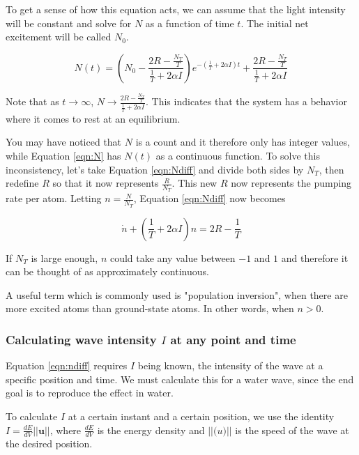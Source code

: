 \documentclass{article}
\begin{document}
To get a sense of how this equation acts, we can assume that the light intensity will be constant and solve for $N$ as a function of time $t$. The initial net excitement will be called $N_0$.

\begin{equation}\label{eqn:N}
    N(t) = \left(N_0 - \frac{2R - \frac{N_T}{T}}{\frac{1}{T} + 2 \alpha I} \right) e^{-\left(\frac{1}{T} + 2 \alpha I\right)t} + \frac{2R - \frac{N_T}{T}}{\frac{1}{T} + 2 \alpha I}
\end{equation}

Note that as $t \rightarrow \infty$, $N \rightarrow \frac{2R - \frac{N_T}{T}}{\frac{1}{T} + 2 \alpha I}$. This indicates that the system has a behavior where it comes to rest at an equilibrium.

You may have noticed that $N$ is a count and it therefore only has integer values, while Equation \ref{eqn:N} has $N(t)$ as a continuous function. To solve this inconsistency, let's take Equation \ref{eqn:Ndiff} and divide both sides by $N_T$, then redefine $R$ so that it now represents $\frac{R}{N_T}$. This new $R$ now represents the pumping rate per atom. Letting $n = \frac{N}{N_T}$, Equation \ref{eqn:Ndiff} now becomes

\begin{equation}\label{eqn:ndiff}
    \dot{n} + (\frac{1}{T} + 2\alpha I)n = 2R - \frac{1}{T}
\end{equation}

If $N_T$ is large enough, $n$ could take any value between $-1$ and $1$ and therefore it can be thought of as approximately continuous.

A useful term which is commonly used is "population inversion", when there are more excited atoms than ground-state atoms. In other words, when $n > 0$.

\subsubsection{Calculating wave intensity $I$ at any point and time}

Equation \ref{eqn:ndiff} requires $I$ being known, the intensity of the wave at a specific position and time. We must calculate this for a water wave, since the end goal is to reproduce the effect in water.

To calculate $I$ at a certain instant and a certain position, we use the identity $I = \frac{dE}{dV} ||\mathbf{u}||$, where $\frac{dE}{dV}$ is the energy density and $||\mathbf(u)||$ is the speed of the wave at the desired position.
\end{document}
